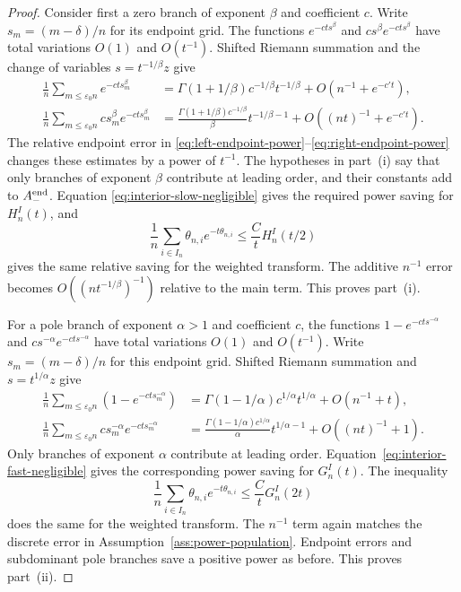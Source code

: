 \documentclass[11pt]{article}
\theoremstyle{remark}
\theoremstyle{plain}
\newcommand{\eps}{\varepsilon}
\begin{document}
\begin{proof}
Consider first a zero branch of exponent $\beta$ and coefficient $c$.
Write $s_m=(m-\delta)/n$ for its endpoint grid.
The functions $e^{-cts^\beta}$ and
$cs^\beta e^{-cts^\beta}$ have total variations $O(1)$ and $O(t^{-1})$.
Shifted Riemann summation and the change of variables
$s=t^{-1/\beta}z$ give
\begin{align*}
 \frac1n\sum_{m\le\eps_0n}e^{-ct s_m^\beta}
 &=\Gamma(1+1/\beta)c^{-1/\beta}t^{-1/\beta}
   +O(n^{-1}+e^{-c't}),\\
 \frac1n\sum_{m\le\eps_0n}cs_m^\beta e^{-ct s_m^\beta}
 &=\frac{\Gamma(1+1/\beta)c^{-1/\beta}}\beta
 t^{-1/\beta-1}+O((nt)^{-1}+e^{-c't}).
\end{align*}
The relative endpoint error in
\eqref{eq:left-endpoint-power}--\eqref{eq:right-endpoint-power} changes
these estimates by a power of $t^{-1}$.  The hypotheses in part~(i) say that
only branches of exponent $\beta$ contribute at leading order, and their
constants add to $A_-^{\rm end}$.  Equation
\eqref{eq:interior-slow-negligible} gives the required power saving for
$H_n^I(t)$, and
\[
 \frac1n\sum_{i\in I_n}\theta_{n,i}e^{-t\theta_{n,i}}
 \le \frac Ct H_n^I(t/2)
\]
gives the same relative saving for the weighted transform.  The additive
$n^{-1}$ error becomes $O((nt^{-1/\beta})^{-1})$ relative to the main
term.  This proves part~(i).

For a pole branch of exponent $\alpha>1$ and coefficient $c$, the functions
$1-e^{-ct s^{-\alpha}}$ and
$cs^{-\alpha}e^{-ct s^{-\alpha}}$ have total variations $O(1)$ and
$O(t^{-1})$.  Write $s_m=(m-\delta)/n$ for this endpoint grid.  Shifted
Riemann summation and $s=t^{1/\alpha}z$ give
\begin{align*}
 \frac1n\sum_{m\le\eps_0n}(1-e^{-ct s_m^{-\alpha}})
 &=\Gamma(1-1/\alpha)c^{1/\alpha}t^{1/\alpha}
   +O(n^{-1}+t),\\
 \frac1n\sum_{m\le\eps_0n}cs_m^{-\alpha}e^{-ct s_m^{-\alpha}}
 &=\frac{\Gamma(1-1/\alpha)c^{1/\alpha}}\alpha
 t^{1/\alpha-1}+O((nt)^{-1}+1).
\end{align*}
Only branches of exponent $\alpha$ contribute at leading order.
Equation~\eqref{eq:interior-fast-negligible} gives the corresponding power
saving for $G_n^I(t)$.  The inequality
\[
 \frac1n\sum_{i\in I_n}\theta_{n,i}e^{-t\theta_{n,i}}
 \le \frac Ct G_n^I(2t)
\]
does the same for the weighted transform.  The $n^{-1}$ term again matches
the discrete error in Assumption~\ref{ass:power-population}.  Endpoint errors
and subdominant pole branches save a positive power as before.  This proves
part~(ii).
\end{proof}
\end{document}
